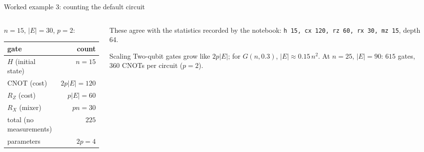 \documentclass[aspectratio=169,11pt]{beamer}
\begin{document}
\begin{frame}{Worked example 3: counting the default circuit}
  \begin{columns}[T]
    \begin{column}{0.5\textwidth}
      $n = 15$, $|E| = 30$, $p = 2$:
      \begin{center}\small
      \begin{tabular}{lr}
        \toprule gate & count\\ \midrule
        $H$ (initial state) & $n = 15$\\
        CNOT (cost) & $2p|E| = 120$\\
        $R_Z$ (cost) & $p|E| = 60$\\
        $R_X$ (mixer) & $pn = 30$\\ \midrule
        total (no measurements) & $225$\\
        parameters & $2p = 4$\\ \bottomrule
      \end{tabular}
      \end{center}
    \end{column}
    \begin{column}{0.46\textwidth}
      These agree with the statistics recorded by the notebook: \texttt{h 15, cx 120, rz 60, rx 30, mz 15}, depth 64.
      \begin{block}{Scaling}
        Two-qubit gates grow like $2p|E|$; for $G(n, 0.3)$, $|E| \approx 0.15\,n^2$. At $n = 25$, $|E| = 90$:
        $615$ gates, $360$ CNOTs per circuit ($p = 2$).
      \end{block}
    \end{column}
  \end{columns}
\end{frame}

\end{document}
